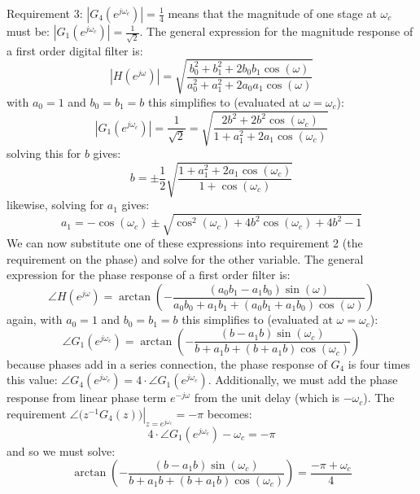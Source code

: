 Requirement 3: $|G_4(e^{j \omega_c})|= \frac{1}{4}$ means that the magnitude of one stage at $\omega_c$ must be: $|G_1(e^{j \omega_c})| = \frac{1}{\sqrt{2}}$. The general expression for the magnitude response of a first order digital filter is:
\begin{equation}
 |H(e^{j \omega})| = \sqrt{\frac{b_0^2 + b_1^2 + 2 b_0 b_1 \cos (\omega)}{a_0^2 + a_1^2 + 2 a_0 a_1 \cos (\omega)}}
\end{equation}
with $a_0=1$ and $b_0=b_1=b$ this simplifies to (evaluated at $\omega=\omega_c$):
\begin{equation}
\boxed
{
 |G_1(e^{j \omega_c})| = \frac{1}{\sqrt{2}} 
 = \sqrt{\frac{2 b^2 + 2 b^2 \cos (\omega_c)}{1 + a_1^2 + 2 a_1 \cos (\omega_c)}}
 }
 \label{equation1}
\end{equation}
solving this for $b$ gives:
\begin{equation}
 b = \pm \frac{1}{2} \sqrt{\frac{1 + a_1^2 + 2a_1 \cos(\omega_c)}{1 + \cos(\omega_c)} } 
\end{equation}
likewise, solving for $a_1$ gives:
\begin{equation}
 a_1 = -\cos(\omega_c) \pm \sqrt{\cos^2(\omega_c) + 4 b^2 \cos(\omega_c) + 4 b^2 -1} 
\end{equation}
We can now substitute one of these expressions into requirement 2 (the requirement on the phase) and solve for the other variable. The general expression for the phase response of a first order filter is:
\begin{equation}
 \angle H(e^{j \omega}) = \arctan \left(- \frac{(a_0 b_1 - a_1 b_0) \sin (\omega)}
                                               {a_0 b_0 + a_1 b_1 + (a_0 b_1 + a_1 b_0) \cos (\omega)} \right)
\end{equation}
again, with $a_0=1$ and $b_0=b_1=b$ this simplifies to (evaluated at $\omega=\omega_c$):
\begin{equation}
 \angle G_1(e^{j \omega_c}) = \arctan \left(- \frac{(b - a_1 b) \sin (\omega_c)}
                                                   {b + a_1 b + (b + a_1 b) \cos (\omega_c)} \right)
\end{equation}
because phases add in a series connection, the phase response of $G_4$ is four times this value: $\angle G_4(e^{j \omega_c}) = 4 \cdot \angle G_1(e^{j \omega_c})$. Additionally, we must add the phase response from linear phase term $e^{-j \omega}$ from the unit delay (which is $-\omega_c$). The requirement $\left. \angle \big( z^{-1} G_4(z) \big) \right|_{z=e^{j \omega_c}} = -\pi$ becomes: 
\begin{equation}
4 \cdot \angle G_1(e^{j \omega_c}) - \omega_c = -\pi
\end{equation}
and so we must solve:
\begin{equation}
 \arctan \left(- \frac{(b - a_1 b) \sin (\omega_c)} {b + a_1 b + (b + a_1 b) \cos (\omega_c)} \right) 
 = \frac{-\pi + \omega_c}{4}
\end{equation}

